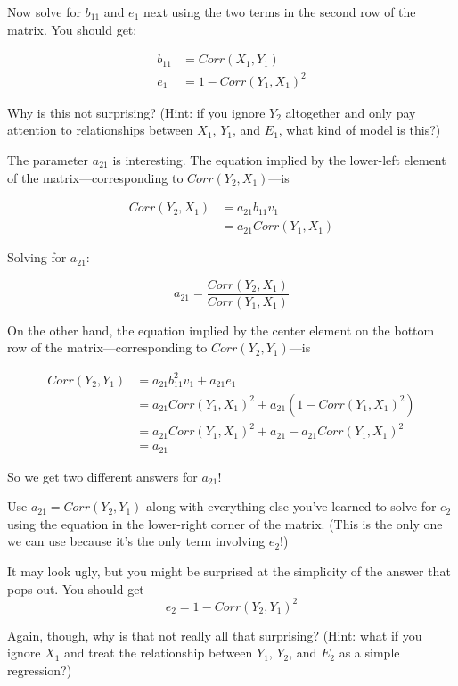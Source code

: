 \documentclass[
]{book}
\begin{document}
Now solve for \(b_{11}\) and \(e_{1}\) next using the two terms in the second row of the matrix. You should get:

\begin{align}
b_{11}  &= Corr(X_{1}, Y_{1})       \\
e_{1}   &= 1 - Corr(Y_{1}, X_{1})^{2}
\end{align}

Why is this not surprising? (Hint: if you ignore \(Y_{2}\) altogether and only pay attention to relationships between \(X_{1}\), \(Y_{1}\), and \(E_{1}\), what kind of model is this?)

The parameter \(a_{21}\) is interesting. The equation implied by the lower-left element of the matrix---corresponding to \(Corr(Y_{2}, X_{1})\)---is

\begin{align}
Corr(Y_{2}, X_{1})  &= a_{21}b_{11}v_{1}        \\
                    &= a_{21}Corr(Y_{1}, X_{1})
\end{align}

Solving for \(a_{21}\):

\[
a_{21} = \frac{Corr(Y_{2}, X_{1})}{Corr(Y_{1}, X_{1})}
\]

On the other hand, the equation implied by the center element on the bottom row of the matrix---corresponding to \(Corr(Y_{2}, Y_{1})\)---is

\begin{align}
Corr(Y_{2}, Y_{1})
    &= a_{21}b_{11}^{2}v_{1} + a_{21}e_{1}  \\
    &= a_{21}Corr(Y_{1}, X_{1})^{2} + 
        a_{21}\left( 1 - Corr(Y_{1}, X_{1})^{2} \right) \\
    &= a_{21}Corr(Y_{1}, X_{1})^{2} +
        a_{21} - a_{21}Corr(Y_{1}, X_{1})^{2}       \\
    &= a_{21}
\end{align}

So we get two different answers for \(a_{21}\)!

Use \(a_{21} = Corr(Y_{2}, Y_{1})\) along with everything else you've learned to solve for \(e_{2}\) using the equation in the lower-right corner of the matrix. (This is the only one we can use because it's the only term involving \(e_{2}\)!)

It may look ugly, but you might be surprised at the simplicity of the answer that pops out. You should get
\[
e_{2} = 1 - Corr(Y_{2}, Y_{1})^{2}
\]

Again, though, why is that not really all that surprising? (Hint: what if you ignore \(X_{1}\) and treat the relationship between \(Y_{1}\), \(Y_{2}\), and \(E_{2}\) as a simple regression?)
\end{document}
